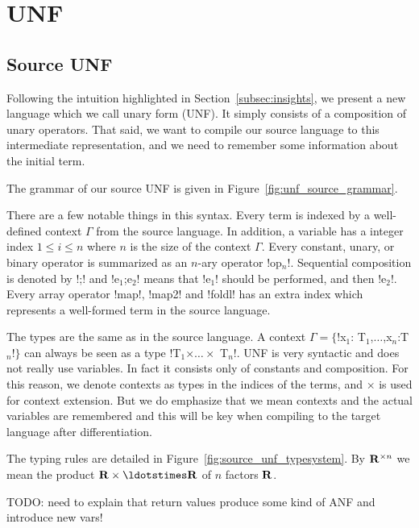 \section{UNF}
\label{sec:unf}

\subsection{Source UNF} %
\label{sub:Source UNF}

Following the intuition highlighted in Section~\ref{subsec:insights}, we present a new language which we call unary form (UNF). 
It simply consists of a composition of unary operators. That said, we want to compile our source language to this intermediate representation, 
and we need to remember some information about the initial term. 

The grammar of our source UNF is given in Figure~\ref{fig:unf_source_grammar}. 



There are a few notable things in this syntax. 
Every term is indexed by a well-defined context $\Gamma$ from the source language.
In addition, a variable has a integer index $1\leq i\leq n$ where $n$ is the size of the context $\Gamma$.
Every constant, unary, or binary operator is summarized as an $n$-ary operator !op$_n$!.
Sequential composition is denoted by !;! and !e$_{1}$;e$_{2}$! means that !e$_{1}$! should be performed, and then !e$_{2}$!.
Every array operator !map!, !map2! and !foldl! has an extra index which represents a well-formed term in the source language.

The types are the same as in the source language. 
A context $\Gamma=\{$!x$_{1}$: T$_{1}$,$\ldots$,x$_n$:T$_n$!$\}$ can always be seen as a type !T$_{1}$$\times\ldots\times$ T$_n$!.
UNF is very syntactic and does not really use variables. 
In fact it consists only of constants and composition. 
For this reason, we denote contexts as types in the indices of the terms, and $\times$ is used for context extension.
But we do emphasize that we mean contexts and the actual variables are remembered and
this will be key when compiling to the target language after differentiation. 

The typing rules are detailed in Figure~\ref{fig:source_unf_typesystem}.
By $\mathbf{R}^{\times n}$ we mean the product $\reals\times\ldotstimes\reals$ of $n$ factors $\mathbf{R}$.

TODO: need to explain that return values produce some kind of ANF and introduce new vars!

